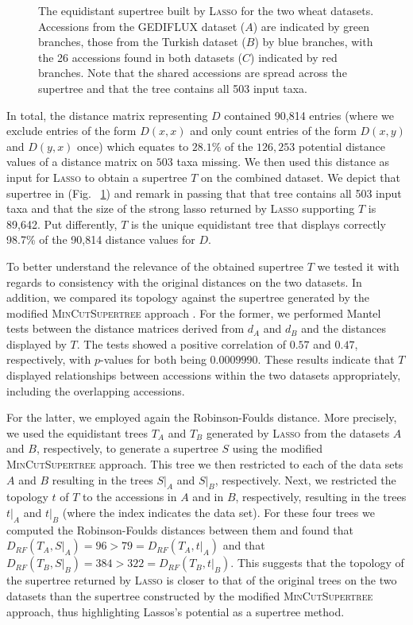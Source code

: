 \begin{figure}
  \centering {}
  \caption{The equidistant supertree built by \textsc{Lasso} for the two wheat
    datasets. Accessions from the GEDIFLUX dataset ($A$) are indicated by
    green branches, those from the Turkish dataset ($B$) by blue branches,
    with the 26 accessions found in both datasets ($C$) indicated by red
    branches. Note that the shared accessions are spread across the supertree
    and that the tree contains all 503 input taxa.}
  \label{fig:wheat-supertree}
\end{figure}

In total, the distance matrix representing $D$ contained 90,814 entries (where
we exclude entries of the form $D(x,x)$ and only count entries of the form
$D(x,y)$ and $D(y,x)$ once) which equates to $28.1\%$ of the $126,253$
potential distance values of a distance matrix on $503$ taxa missing.  We then
used this distance as input for \textsc{Lasso} to obtain a supertree $T$ on
the combined dataset. We depict that supertree in (Fig.~
\ref{fig:wheat-supertree}) and remark in passing that that tree contains all
503 input taxa and that the size of the strong lasso returned by
\textsc{Lasso} supporting $T$ is 89,642. Put differently, $T$ is the unique
equidistant tree that displays correctly 98.7\% of the 90,814 distance values
for $D$.

To better understand the relevance of the obtained supertree $T$ we tested it
with regards to consistency with the original distances on the two
datasets. In addition, we compared its topology against the supertree
generated by the modified \textsc{MinCutSupertree} approach
\cite{page02mincut}.  For the former, we performed Mantel tests between the
distance matrices derived from $d_A$ and $d_B$ and the distances displayed by
$T$.  The tests showed a positive correlation of $0.57$ and $0.47$,
respectively, with $p$-values for both being $0.0009990$. These results
indicate that $T$ displayed relationships between accessions within the two
datasets appropriately, including the overlapping accessions.

For the latter, we employed again the Robinson-Foulds distance. More
precisely, we used the equidistant trees $T_A$ and $T_B$ generated by
\textsc{Lasso} from the datasets $A$ and $B$, respectively, to generate a
supertree $S$ using the modified \textsc{MinCutSupertree} approach. This tree
we then restricted to each of the data sets $A$ and $B$ resulting in the trees
$S|_A$ and $S|_B$, respectively. Next, we restricted the topology $t$ of $T$
to the accessions in $A$ and in $B$, respectively, resulting in the trees
$t|_A$ and $t|_B$ (where the index indicates the data set). For these four
trees we computed the Robinson-Foulds distances between them and found that
$D_{RF}(T_A,S|_A)= 96>79= D_{RF}(T_A,t|_A)$ and that $D_{RF}(T_B,S|_B)=
384>322=D_{RF}(T_B,t|_B)$.  This suggests that the topology of the supertree
returned by \textsc{Lasso} is closer to that of the original trees on the two
datasets than the supertree constructed by the modified
\textsc{MinCutSupertree} approach, thus highlighting {\sc Lassos}'s potential
as a supertree method.

